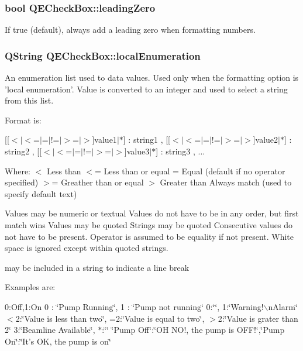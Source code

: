 \hypertarget{classQECheckBox_adc5f39f75575556f2d61b7ac58febaaa}{
\subsubsection[{leadingZero}]{\setlength{\rightskip}{0pt plus 5cm}bool QECheckBox::leadingZero}}
\label{classQECheckBox_adc5f39f75575556f2d61b7ac58febaaa}
If true (default), always add a leading zero when formatting numbers. \hypertarget{classQECheckBox_a84e3a7d33551b227db49d75fe66da417}{
\subsubsection[{localEnumeration}]{\setlength{\rightskip}{0pt plus 5cm}QString QECheckBox::localEnumeration}}
\label{classQECheckBox_a84e3a7d33551b227db49d75fe66da417}
An enumeration list used to data values. Used only when the formatting option is 'local enumeration'. Value is converted to an integer and used to select a string from this list.

Format is:

\mbox{[}\mbox{[}$<$$|$$<$=$|$=$|$!=$|$$>$=$|$$>$\mbox{]}value1$|$$\ast$\mbox{]} : string1 , \mbox{[}\mbox{[}$<$$|$$<$=$|$=$|$!=$|$$>$=$|$$>$\mbox{]}value2$|$$\ast$\mbox{]} : string2 , \mbox{[}\mbox{[}$<$$|$$<$=$|$=$|$!=$|$$>$=$|$$>$\mbox{]}value3$|$$\ast$\mbox{]} : string3 , ...

Where: $<$ Less than $<$= Less than or equal = Equal (default if no operator specified) $>$= Greather than or equal $>$ Greater than Always match (used to specify default text)

Values may be numeric or textual Values do not have to be in any order, but first match wins Values may be quoted Strings may be quoted Consecutive values do not have to be present. Operator is assumed to be equality if not present. White space is ignored except within quoted strings. \par
 may be included in a string to indicate a line break

Examples are:

0:Off,1:On 0 : \char`\"{}Pump Running\char`\"{}, 1 : \char`\"{}Pump not running\char`\"{} 0:\char`\"{}\char`\"{}, 1:\char`\"{}Warning!$\backslash$nAlarm\char`\"{} $<$2:\char`\"{}Value is less than two\char`\"{}, =2:\char`\"{}Value is equal to two\char`\"{}, $>$2:\char`\"{}Value is grater than 2\char`\"{} 3:\char`\"{}Beamline Available\char`\"{}, $\ast$:\char`\"{}\char`\"{} \char`\"{}Pump Off\char`\"{}:\char`\"{}OH NO!, the pump is OFF!\char`\"{},\char`\"{}Pump On\char`\"{}:\char`\"{}It's OK, the pump is on\char`\"{}

